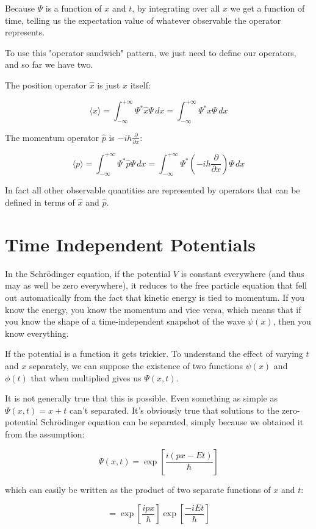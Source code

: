 Because $\Psi$ is a function of $x$ and $t$, by integrating over all $x$ we get a function of time, telling us the expectation value of whatever observable the operator represents.

To use this "operator sandwich" pattern, we just need to define our operators, and so far we have two.

The position operator $\hat{x}$ is just $x$ itself:

$$
\langle x \rangle =
\int_{-\infty}^{+\infty}
\Psi^*
\hat{x}
\Psi
\,dx
=
\int_{-\infty}^{+\infty}
\Psi^*
x
\Psi
\,dx
$$

The momentum operator $\hat{p}$ is $-ih\frac{\partial}{\partial x}$:

$$
\langle p \rangle =
\int_{-\infty}^{+\infty}
\Psi^*
\hat{p}
\Psi
\,dx
=
\int_{-\infty}^{+\infty}
\Psi^*
(-ih\frac{\partial}{\partial x})
\Psi
\,dx
$$

In fact all other observable quantities are represented by operators that can be defined in terms of $\hat{x}$ and $\hat{p}$.

\section{Time Independent Potentials}

In the Schrödinger equation, if the potential $V$ is constant everywhere (and thus may as well be zero everywhere), it reduces to the free particle equation that fell out automatically from the fact that kinetic energy is tied to momentum. If you know the energy, you know the momentum and vice versa, which means that if you know the shape of a time-independent snapshot of the wave $\psi(x)$, then you know everything.

If the potential is a function it gets trickier. To understand the effect of varying $t$ and $x$ separately, we can suppose the existence of two functions $\psi(x)$ and $\phi(t)$ that when multiplied gives us $\Psi(x, t)$.

It is not generally true that this is possible. Even something as simple as $\Psi(x, t) = x + t$ can't separated. It's obviously true that solutions to the zero-potential Schrödinger equation can be separated, simply because we obtained it from the assumption:

$$
\Psi(x, t) = \exp \left[ {\frac{i(px - Et)}{\hbar}} \right]
$$

which can easily be written as the product of two separate functions of $x$ and $t$:

$$
= \exp \left[ {\frac{ipx}{\hbar}} \right]
\exp \left[ {\frac{-iEt}{\hbar}} \right]
$$

